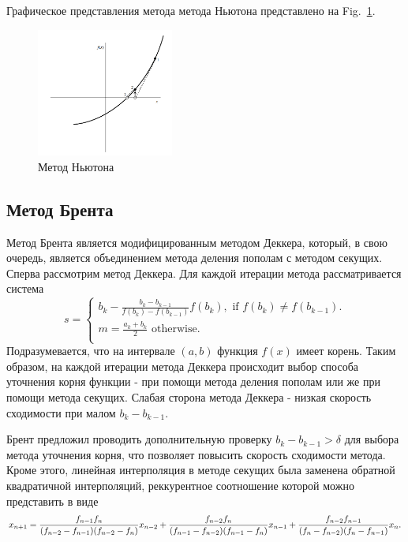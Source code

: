 \documentclass[
11pt,%
tightenlines,%
twoside,%
onecolumn,%
nofloats,%
nobibnotes,%
nofootinbib,%
superscriptaddress,%
noshowpacs,%
centertags]%
{revtex4}
\begin{document}
Графическое представления метода метода Ньютона представлено на Fig.~\ref{fig:newton}.
\begin{figure}[h]
\setcaptionmargin{5mm}
\onelinecaptionstrue
\includegraphics[width=0.4\textwidth]{pics/newton.png}
\caption{Метод Ньютона}\label{fig:newton}
\end{figure}

\subsection{Метод Брента}
Метод Брента является модифицированным методом Деккера, который, в свою очередь, является объединением метода деления пополам с методом секущих.
Сперва рассмотрим метод Деккера. Для каждой итерации метода рассматривается система
\begin{equation}
s=\begin{cases}
b_k - \frac{b_k-b_{k-1}}{f(b_k)-f(b_{k-1})}f(b_k), \text{ if $f(b_k) \neq f(b_{k-1})$}.\\
m = \frac{a_k+b_k}{2} \text{ otherwise}.\\
\end{cases}
\end{equation}
Подразумевается, что на интервале $(a,b)$ функция $f(x)$ имеет корень. Таким образом, на каждой итерации метода Деккера происходит выбор способа уточнения корня функции - при помощи метода деления пополам или же при помощи метода секущих. Слабая сторона метода Деккера - низкая скорость сходимости при малом $b_k-b_{k-1}$. 

Брент предложил проводить дополнительную проверку $b_k-b_{k-1} > \delta$ для выбора метода уточнения корня, что позволяет повысить скорость сходимости метода. Кроме этого, линейная интерполяция в методе секущих была заменена обратной квадратичной интерполяций, реккурентное соотношение которой можно представить в виде
\begin{equation}
x_{n+1}=\frac{f_{n-1}f_n}{(f_{n-2}-f_{n-1})(f_{n-2}-f_n)}x_{n-2}+ \\\frac{f_{n-2}f_n}{(f_{n-1}-f_{n-2})(f_{n-1}-f_n)}x_{n-1}+\frac{f_{n-2}f_{n-1}}{(f_{n}-f_{n-2})(f_{n}-f_{n-1})}x_{n}.
\end{equation}
\end{document}
